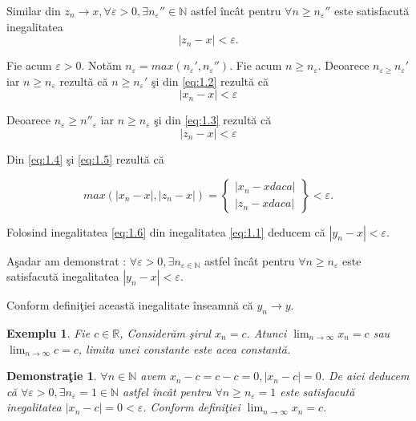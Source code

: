 \documentclass[a4paper,12pt,oneside]{report}
\newtheorem{demonstration}{Demonstra\c tie}
\newtheorem{example}{Exemplu}
\begin{document}
Similar din \(z_{n} \to x, \forall \varepsilon > 0,\exists {n_{\varepsilon }}'' \in \mathbb{N}\) astfel \^ inc\^ at pentru \(\forall n\geq {n_{\varepsilon }}''\) este satisfacut\u a inegalitatea \[\left | z_{n} -x \right |< \varepsilon. \label{eq:1.3} \tag{1.3}\]

Fie acum \(\varepsilon > 0.\) Not\u am \(n_{\varepsilon } = max ({n_{\varepsilon }}', {n_{\varepsilon }}'')\). Fie acum \(n\geq n_{\varepsilon }\). Deoarece \(n_{\varepsilon \geq }{n_{\varepsilon }}'\) iar \(n\geq n_{\varepsilon }\) rezult\u a c\u a \(n\geq {n_{\varepsilon }}'\) \c si din \ref{eq:1.2} rezult\u a c\u a \[\left | x_{n} - x \right |< \varepsilon \label{eq:1.4} \tag{1.4} \]
	
Deoarece \(n_{\varepsilon }\geq {n}''_{\varepsilon }\) iar \(n\geq n_{\varepsilon}\) \c si din \ref{eq:1.3} rezult\u a c\u a  \[\left | z_{n}-x  \right |< \varepsilon \label{eq:1.5} \tag{1.5}\]
	
Din \ref{eq:1.4} \c si \ref{eq:1.5} rezult\u a c\u a

\[ max(\left | x_{n} -x  \right |, \left | z_{n}-x \right |) = \begin{Bmatrix}
\left | x_{n}-x daca  \right |\\ 
\left | z_{n}-x daca  \right |
\end{Bmatrix} < \varepsilon.  \label{eq:1.6} \tag{1.6} \]

Folosind inegalitatea \ref{eq:1.6} din inegalitatea \ref{eq:1.1} deducem c\u a \(\left | y_{n}-x  \right |< \varepsilon\).
 
A\c sadar am demonstrat : \(\forall \varepsilon > 0, \exists n_{\varepsilon \in \mathbb{N}}\) astfel \^ inc\^ at pentru \(\forall n\geq n_{\varepsilon }\) este satisfacut\u a inegalitatea \(\left | y_{n}-x \right |< \varepsilon.\) 

Conform defini\c tiei aceast\u a inegalitate \^ inseamn\u a c\u a \(y_{n} \to y.\) 

\begin{example}
  Fie \(c \in \mathbb{R}\), Consider\u am \c sirul \(x_{n}=c\). Atunci \(\lim_{n \to \infty }x_{n}=c\) sau \(\lim_{n \to \infty }c=c\), limita unei constante este acea constant\u a. 
\end{example}


\begin{demonstration}
  \(\forall n\in \mathbb{N}\) avem \(x_{n} - c = c - c = 0 , \left | x_{n}-c \right |= 0\). De aici deducem c\u a \(\forall \varepsilon > 0, \exists n_{\varepsilon} = 1 \in \mathbb{N}\) astfel \^ inc\^ at pentru \(\forall n\geq n_{\varepsilon }= 1\) este satisfacut\u a inegalitatea \(\left | x_{n}-c \right |= 0< \varepsilon\). 
	Conform defini\c tiei \(\lim_{n \to \infty }x_{n} = c. \)
\end{demonstration}
\end{document}
